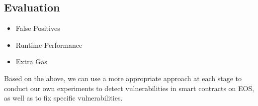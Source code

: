 \documentclass[a4paper, 10pt, conference, twocolumn]{ieeeconf}       %
\begin{document}
\subsection{Evaluation}

\begin{itemize}
    \item False Positives
    \item Runtime Performance
    \item Extra Gas
\end{itemize}

Based on the above, we can use a more appropriate approach at each stage to conduct our own experiments to detect vulnerabilities in smart contracts on EOS, as well as to fix specific vulnerabilities.

\addtolength{\textheight}{-12cm}   %














\end{document}
